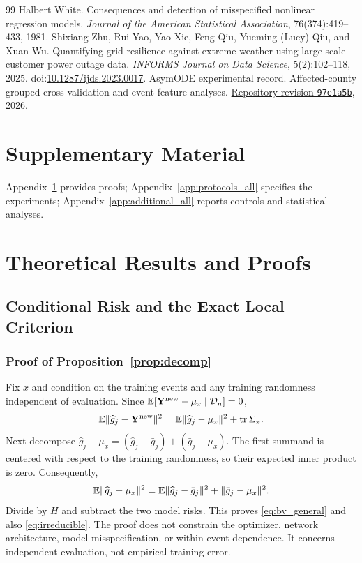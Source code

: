 \begin{thebibliography}{99}
Halbert White. Consequences and detection of misspecified nonlinear regression models. \emph{Journal of the American Statistical Association}, 76(374):419--433, 1981.
Shixiang Zhu, Rui Yao, Yao Xie, Feng Qiu, Yueming (Lucy) Qiu, and Xuan Wu. Quantifying grid resilience against extreme weather using large-scale customer power outage data. \emph{INFORMS Journal on Data Science}, 5(2):102--118, 2025. doi:\url{10.1287/ijds.2023.0017}.
AsymODE experimental record. Affected-county grouped cross-validation and event-feature analyses. \href{https://github.com/ShuaiWang-Castle/asymode-open-data/commit/97e1a5b343ecdc8d4bc333fd8fc0342c01bea6c4}{Repository revision \texttt{97e1a5b}}, 2026.
\end{thebibliography}


\clearpage
\onecolumn
\appendix
\section*{Supplementary Material}
Appendix~\ref{app:theory_all} provides proofs; Appendix~\ref{app:protocols_all} specifies the experiments; Appendix~\ref{app:additional_all} reports controls and statistical analyses.

\section{Theoretical Results and Proofs}\label{app:theory_all}
\subsection{Conditional Risk and the Exact Local Criterion}
\label{app:proof}
\subsubsection{Proof of Proposition~\ref{prop:decomp}}
Fix $x$ and condition on the training events and any training randomness independent of evaluation. Since $\mathbb E[\mathbf Y^{\rm new}-\mu_x\mid\mathcal D_n]=0$,
\begin{equation}
 \mathbb E\|\widehat g_j-\mathbf Y^{\rm new}\|^2
 =\mathbb E\|\widehat g_j-\mu_x\|^2+\operatorname{tr}\Sigma_x.
 \label{eq:app_risk_split}
\end{equation}
Next decompose $\widehat g_j-\mu_x=(\widehat g_j-\bar g_j)+(\bar g_j-\mu_x)$. The first summand is centered with respect to the training randomness, so their expected inner product is zero. Consequently,
\[
 \mathbb E\|\widehat g_j-\mu_x\|^2
 =\mathbb E\|\widehat g_j-\bar g_j\|^2+\|\bar g_j-\mu_x\|^2.
\]
Divide by $H$ and subtract the two model risks. This proves \eqref{eq:bv_general} and also \eqref{eq:irreducible}. The proof does not constrain the optimizer, network architecture, model misspecification, or within-event dependence. It concerns independent evaluation, not empirical training error.

